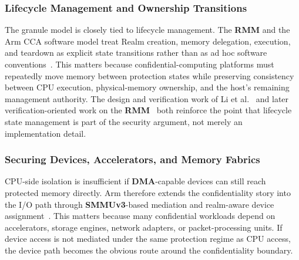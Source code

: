 \subsubsection{Lifecycle Management and Ownership Transitions}

The granule model is closely tied to lifecycle management. The \textbf{RMM} and the Arm CCA software model treat Realm creation, memory delegation, execution, and teardown as explicit state transitions rather than as ad hoc software conventions~\cite{arm_rmm_spec,linux_arm_cca_doc}. This matters because confidential-computing platforms must repeatedly move memory between protection states while preserving consistency between CPU execution, physical-memory ownership, and the host's remaining management authority. The design and verification work of Li et al.~\cite{li2022cca} and later verification-oriented work on the \textbf{RMM}~\cite{wu2024rmm} both reinforce the point that lifecycle state management is part of the security argument, not merely an implementation detail.

\subsubsection{Securing Devices, Accelerators, and Memory Fabrics}

CPU-side isolation is insufficient if \textbf{DMA}-capable devices can still reach protected memory directly. Arm therefore extends the confidentiality story into the I/O path through \textbf{SMMUv3}-based mediation and realm-aware device assignment~\cite{arm_smmu_spec,acai2023,bertschi2026devlore}. This matters because many confidential workloads depend on accelerators, storage engines, network adapters, or packet-processing units. If device access is not mediated under the same protection regime as CPU access, the device path becomes the obvious route around the confidentiality boundary.

